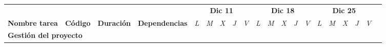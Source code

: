 \begin{longtable}[c]{llclllllllllllllllll}
        \multicolumn{1}{|c|}{}                                                                                                  & \multicolumn{1}{c|}{}                                                          & \multicolumn{1}{c|}{}                                                            & \multicolumn{1}{c|}{}                                                                & \multicolumn{5}{c|}{\textbf{Dic 11}}                                                                                                                                    & \multicolumn{5}{c|}{\textbf{Dic 18}}                                                                                                                                    & \multicolumn{5}{c|}{\textbf{Dic 25}}                                                                                                                                                  &  \\ \cline{5-19}
        \multicolumn{1}{|c|}{\multirow{-2}{*}{\textbf{Nombre tarea}}}                                                           & \multicolumn{1}{c|}{\multirow{-2}{*}{\textbf{Código}}}                         & \multicolumn{1}{c|}{\multirow{-2}{*}{\textbf{Duración}}}                         & \multicolumn{1}{c|}{\multirow{-2}{*}{\textbf{Dependencias}}}                         & \multicolumn{1}{l|}{\textit{L}} & \multicolumn{1}{l|}{\textit{M}} & \multicolumn{1}{l|}{\textit{X}} & \multicolumn{1}{l|}{\textit{J}} & \multicolumn{1}{l|}{\textit{V}} & \multicolumn{1}{l|}{\textit{L}} & \multicolumn{1}{l|}{\textit{M}} & \multicolumn{1}{l|}{\textit{X}} & \multicolumn{1}{l|}{\textit{J}} & \multicolumn{1}{l|}{\textit{V}} & \multicolumn{1}{l|}{\textit{L}} & \multicolumn{1}{l|}{\textit{M}} & \multicolumn{1}{l|}{\textit{X}} & \multicolumn{1}{l|}{\textit{J}} & \multicolumn{1}{l|}{\textit{V}}               &  \\ \cline{1-19}
        \multicolumn{4}{|l|}{\textbf{Gestión del proyecto}}                                                                                                                                                                                                                                                                                                                                & \multicolumn{15}{l|}{}                                                                                                                                                                                                                                                                                                                                                                                                                                                                                                                    &  \\ \cline{1-19}

\end{longtable}
